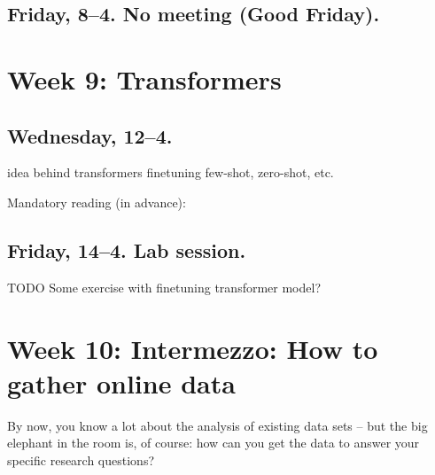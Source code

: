 \subsection*{Friday, 8--4. No meeting (Good Friday).}




\section*{Week 9: Transformers}

\subsection*{Wednesday, 12--4.}

idea behind transformers
finetuning
few-shot, zero-shot, etc.


Mandatory reading (in advance): \cite{Bender2021}








\subsection*{Friday, 14--4. Lab session.}

TODO Some exercise with finetuning transformer model?







\section*{Week 10: Intermezzo: How to gather online data}
By now, you know a lot about the analysis of existing data sets -- but the big elephant in the room is, of course: how can you get the data to answer your specific research questions?

